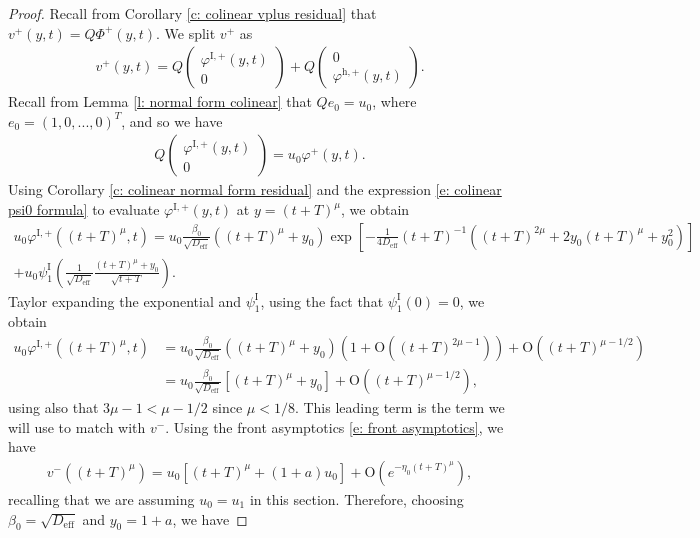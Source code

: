 \documentclass[11pt]{article}
\renewcommand{\phi}{\varphi}
\numberwithin{equation}{section}
\numberwithin{prop}{section}
\newcommand{\Deff}{D_\mathrm{eff}}
\newcommand{\phihp}{\phi^\mathrm{h, +}}
\newcommand{\phiIp}{\phi^{\mathrm{I},+}}
\newcommand{\psiI}{\psi^\mathrm{I}}
\begin{document}
\begin{proof}
	Recall from Corollary \ref{c: colinear vplus residual} that $v^+(y,t) = Q \Phi^+(y,t)$. We split $v^+$ as
	\begin{align*}
	v^+(y,t) =  Q \begin{pmatrix} \phiIp(y,t) \\ 0 \end{pmatrix} + Q \begin{pmatrix} 0 \\ \phihp(y,t) \end{pmatrix}. 
	\end{align*}
	Recall from Lemma \ref{l: normal form colinear} that $Q e_0 = u_0$, where $e_0 = (1, 0, ..., 0)^T$, and so we have 
	\begin{align*}
	Q \begin{pmatrix} \phiIp(y,t) \\ 0 \end{pmatrix} = u_0 \phi^+(y,t). 
	\end{align*}
	Using Corollary \ref{c: colinear normal form residual} and the expression \eqref{e: colinear psi0 formula} to evaluate $\phiIp(y,t)$ at $y = (t+T)^\mu$, we obtain 
	\begin{multline*}
	u_0 \phiIp ((t+T)^\mu, t) =  u_0 \frac{\beta_0}{\sqrt{\Deff}} ((t+T)^\mu + y_0)\exp \left[-\frac{1}{4 \Deff} (t+T)^{-1} \left( (t+T)^{2\mu} + 2 y_0 (t+T)^{\mu} + y_0^2  \right) \right] \\ + u_0 \psiI_1 \left( \frac{1}{\sqrt{\Deff}} \frac{(t+T)^\mu + y_0}{\sqrt{t+T}} \right). 
	\end{multline*}
	Taylor expanding the exponential and $\psiI_1$, using the fact that $\psiI_1(0) = 0$, we obtain 
	\begin{align*}
	u_0 \phiIp ((t+T)^\mu, t) &= u_0 \frac{\beta_0}{\sqrt{\Deff}} ((t+T)^\mu + y_0) \left( 1 + \mathrm{O}((t+T)^{2\mu-1}) \right) + \mathrm{O} ((t+T)^{\mu-1/2}) \\
	&= u_0 \frac{\beta_0}{\sqrt{\Deff}} [ (t+T)^\mu + y_0 ] + \mathrm{O}((t+T)^{\mu-1/2}),
	\end{align*}
	using also that $3 \mu -1 < \mu - 1/2$ since $\mu < 1/8$. This leading term is the term we will use to match with $v^-$. Using the front asymptotics \eqref{e: front asymptotics}, we have
	\begin{align}
	v^-((t+T)^\mu) = u_0 [ (t+T)^\mu + (1 + a) u_0] + \mathrm{O}\left(e^{-\eta_0 (t+T)^\mu} \right), \label{e: colinear v minus expansion}
	\end{align}
	recalling that we are assuming $u_0 = u_1$ in this section. Therefore, choosing $\beta_0 = \sqrt{\Deff}$ and $y_0 = 1+a$, we have 

\end{proof}
\end{document}
